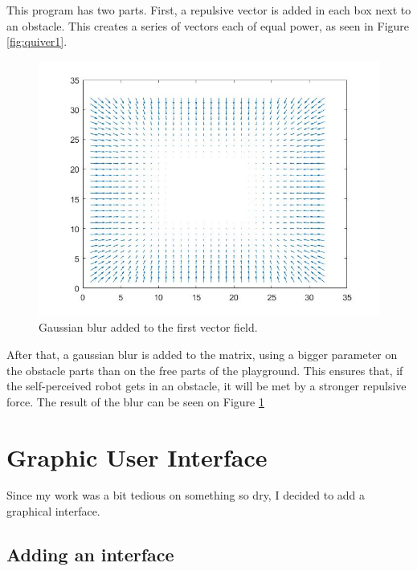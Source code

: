  This program has two parts. First, a repulsive vector is added in each box next to an obstacle.
 This creates a series of vectors each of equal power, as seen in Figure \ref{fig:quiver1}.\\

 \begin{figure}[H]
 \centering
 \includegraphics[scale=0.4]{Figures/quiver2}
 \decoRule
 \caption[Blurred Quiver]{Gaussian blur added to the first vector field.}
 \label{fig:quiver2}
 \end{figure}

 After that, a gaussian blur is added to the matrix, using a bigger parameter on the obstacle parts than on the free parts of the playground.
 This ensures that, if the self-perceived robot gets in an obstacle, it will be met by a stronger repulsive force.
 The result of the blur can be seen on Figure \ref{fig:quiver2}\\



%

\section{Graphic User Interface}

Since my work was a bit tedious on something so dry, I decided to add a graphical interface.

\subsection{Adding an interface}

